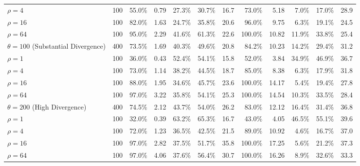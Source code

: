 \begin{table}[!ht]
{\begin{tabular}{@{}l c rrrrr rrrrr@{}}
\quad $\rho = 4$ & 100 & 55.0\% & 0.79 & 27.3\% & 30.7\% & 16.7 & 73.0\% & 5.18 & 7.0\% & 17.0\% & 28.9 \\
\quad $\rho = 16$ & 100 & 82.0\% & 1.63 & 24.7\% & 35.8\% & 20.6 & 96.0\% & 9.75 & 6.3\% & 19.1\% & 24.5 \\
\quad $\rho = 64$ & 100 & 95.0\% & 2.29 & 41.6\% & 61.3\% & 22.6 & 100.0\% & 10.82 & 11.9\% & 33.8\% & 25.4 \\
$\theta = 100$ (Substantial Divergence) & 400 & 73.5\% & 1.69 & 40.3\% & 49.6\% & 20.8 & 84.2\% & 10.23 & 14.2\% & 29.4\% & 31.2 \\
\quad $\rho = 1$ & 100 & 36.0\% & 0.43 & 52.4\% & 54.1\% & 15.8 & 52.0\% & 3.84 & 34.9\% & 46.9\% & 36.7 \\
\quad $\rho = 4$ & 100 & 73.0\% & 1.14 & 38.2\% & 44.5\% & 18.7 & 85.0\% & 8.38 & 6.3\% & 17.9\% & 31.8 \\
\quad $\rho = 16$ & 100 & 88.0\% & 1.95 & 34.6\% & 45.7\% & 23.6 & 100.0\% & 14.17 & 5.4\% & 19.4\% & 27.8 \\
\quad $\rho = 64$ & 100 & 97.0\% & 3.22 & 35.8\% & 54.1\% & 25.3 & 100.0\% & 14.54 & 10.3\% & 33.5\% & 28.4 \\
$\theta = 200$ (High Divergence) & 400 & 74.5\% & 2.12 & 43.7\% & 54.0\% & 26.2 & 83.0\% & 12.12 & 16.4\% & 31.4\% & 36.8 \\
\quad $\rho = 1$ & 100 & 32.0\% & 0.39 & 63.2\% & 65.3\% & 16.7 & 43.0\% & 4.05 & 46.5\% & 55.1\% & 39.6 \\
\quad $\rho = 4$ & 100 & 72.0\% & 1.23 & 36.5\% & 42.5\% & 21.5 & 89.0\% & 10.92 & 4.6\% & 16.7\% & 37.0 \\
\quad $\rho = 16$ & 100 & 97.0\% & 2.82 & 37.5\% & 51.7\% & 35.8 & 100.0\% & 17.25 & 5.6\% & 21.2\% & 37.3 \\
\quad $\rho = 64$ & 100 & 97.0\% & 4.06 & 37.6\% & 56.4\% & 30.7 & 100.0\% & 16.26 & 8.9\% & 32.6\% & 33.3 \\
\bottomrule
\end{tabular}}
\end{table}

\clearpage


